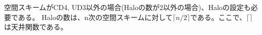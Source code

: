 空間スキームがCD4, UD3以外の場合(Haloの数が2以外の場合)、Haloの設定も必要である。
Haloの数は、n次の空間スキームに対して$\lceil n/2 \rceil$である。ここで、$\lceil \rceil$ は天井関数である。\\

\\
